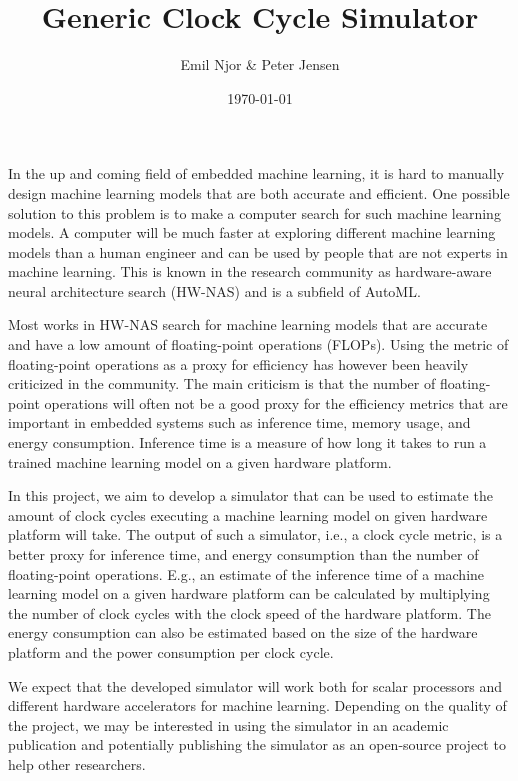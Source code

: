 \documentclass{article}
\title{Generic Clock Cycle Simulator}
\author{Emil Njor \& Peter Jensen}
\date{\today}
\begin{document}
\maketitle
In the up and coming field of embedded machine learning, it is hard to manually design machine learning models that are both accurate and efficient.
One possible solution to this problem is to make a computer search for such machine learning models.
A computer will be much faster at exploring different machine learning models than a human engineer and can be used by people that are not experts in machine learning.
This is known in the research community as hardware-aware neural architecture search (HW-NAS) and is a subfield of AutoML.

Most works in HW-NAS search for machine learning models that are accurate and have a low amount of floating-point operations (FLOPs).
Using the metric of floating-point operations as a proxy for efficiency has however been heavily criticized in the community.
The main criticism is that the number of floating-point operations will often not be a good proxy for the efficiency metrics that are important in embedded systems such as inference time, memory usage, and energy consumption.
Inference time is a measure of how long it takes to run a trained machine learning model on a given hardware platform.

In this project, we aim to develop a simulator that can be used to estimate the amount of clock cycles executing a machine learning model on given hardware platform will take.
The output of such a simulator, i.e., a clock cycle metric, is a better proxy for inference time, and energy consumption than the number of floating-point operations.
E.g., an estimate of the inference time of a machine learning model on a given hardware platform can be calculated by multiplying the number of clock cycles with the clock speed of the hardware platform.
The energy consumption can also be estimated based on the size of the hardware platform and the power consumption per clock cycle.

We expect that the developed simulator will work both for scalar processors and different hardware accelerators for machine learning.
Depending on the quality of the project, we may be interested in using the simulator in an academic publication and potentially publishing the simulator as an open-source project to help other researchers.
\end{document}
